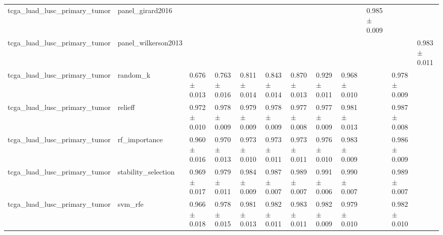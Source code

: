 \begin{table}[t]
\begin{tabular}{llllllllllll}
    tcga\_luad\_lusc\_primary\_tumor & panel\_girard2016 &  &  &  &  &  &  &  & 0.985 $\pm$ 0.009 &  &  \\
    tcga\_luad\_lusc\_primary\_tumor & panel\_wilkerson2013 &  &  &  &  &  &  &  &  &  & 0.983 $\pm$ 0.011 \\
    tcga\_luad\_lusc\_primary\_tumor & random\_k & 0.676 $\pm$ 0.013 & 0.763 $\pm$ 0.016 & 0.811 $\pm$ 0.014 & 0.843 $\pm$ 0.014 & 0.870 $\pm$ 0.013 & 0.929 $\pm$ 0.011 & 0.968 $\pm$ 0.010 &  & 0.978 $\pm$ 0.009 &  \\
    tcga\_luad\_lusc\_primary\_tumor & relieff & 0.972 $\pm$ 0.010 & 0.978 $\pm$ 0.009 & 0.979 $\pm$ 0.009 & 0.978 $\pm$ 0.009 & 0.977 $\pm$ 0.008 & 0.977 $\pm$ 0.009 & 0.981 $\pm$ 0.013 &  & 0.987 $\pm$ 0.008 &  \\
    tcga\_luad\_lusc\_primary\_tumor & rf\_importance & 0.960 $\pm$ 0.016 & 0.970 $\pm$ 0.013 & 0.973 $\pm$ 0.010 & 0.973 $\pm$ 0.011 & 0.973 $\pm$ 0.011 & 0.976 $\pm$ 0.010 & 0.983 $\pm$ 0.009 &  & 0.986 $\pm$ 0.009 &  \\
    tcga\_luad\_lusc\_primary\_tumor & stability\_selection & 0.969 $\pm$ 0.017 & 0.979 $\pm$ 0.011 & 0.984 $\pm$ 0.009 & 0.987 $\pm$ 0.007 & 0.989 $\pm$ 0.007 & 0.991 $\pm$ 0.006 & 0.990 $\pm$ 0.007 &  & 0.989 $\pm$ 0.007 &  \\
    tcga\_luad\_lusc\_primary\_tumor & svm\_rfe & 0.966 $\pm$ 0.018 & 0.978 $\pm$ 0.015 & 0.981 $\pm$ 0.013 & 0.982 $\pm$ 0.011 & 0.983 $\pm$ 0.011 & 0.982 $\pm$ 0.009 & 0.979 $\pm$ 0.010 &  & 0.982 $\pm$ 0.010 &  \\
    \bottomrule
  \end{tabular}
\end{table}
